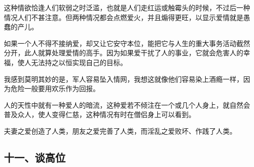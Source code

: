 \par 这种情欲恰逢人们软弱之时泛滥，也就是人们走红运或触霉头的时候，不过后一种情况人们不甚注意。但两种情况都会点燃爱火，并且煽得更旺，以显示爱情就是愚蠢的产儿。
\par 如果一个人不得不接纳爱，却又让它安守本位，能把它与人生的重大事务活动截然分开，此人就算处理爱情的高手。因为如果爱干扰了人的事业，它就会危害人的幸福，使人无法持之以恒实现自己的目标。
\par 我感到莫明其妙的是，军人容易坠入情网，我想这就像他们容易染上酒瘾一样，因为危险一般要用欢乐作为回报。
\par 人的天性中就有一种爱人的暗流，这种爱若不倾注在一个或几个人身上，就自然会普及众人，使人变得仁慈，这种情况有时在僧侣身上可以看到。
\par 夫妻之爱创造了人类，朋友之爱完善了人类，而淫乱之爱败坏、作践了人类。



\subsection*{十一、谈高位}

